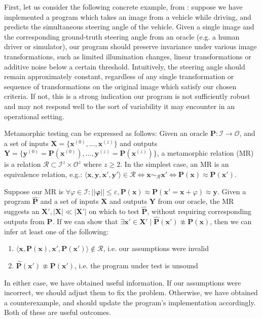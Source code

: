 \documentclass[12pt,initial,twoside,maitrise]{dms}
\numberwithin{equation}{section}
\numberwithin{table}{chapter}
\numberwithin{figure}{chapter}
\begin{document}
First, let us consider the following concrete example, from \citet{tian2018deeptest}: suppose we have implemented a program which takes an image from a vehicle while driving, and predicts the simultaneous steering angle of the vehicle. Given a single image and the corresponding ground-truth steering angle from an oracle (e.g. a human driver or simulator), our program should preserve invariance under various image transformations, such as limited illumination changes, linear transformations or additive noise below a certain threshold. Intuitively, the steering angle should remain approximately constant, regardless of any single transformation or sequence of transformations on the original image which satisfy our chosen criteria. If not, this is a strong indication our program is not sufficiently robust and may not respond well to the sort of variability it may encounter in an operational setting.

Metamorphic testing can be expressed as follows: Given an oracle $\mathbf P: \mathcal I \rightarrow \mathcal O$, and a set of inputs $\mathbf X = \{\mathbf{x}^{(0)}, \dots, \mathbf{x}^{(z)}\}$ and outputs $\mathbf Y = \{\mathbf{y}^{(0)} = \mathbf{P}(\mathbf{x}^{(0)}), \dots, \mathbf{y}^{(z)} = \mathbf{P}(\mathbf{x}^{(z)})\}$, a metamorphic relation (MR) is a relation $\mathcal R \subset \mathcal I^z \times \mathcal O^z$ where $z \geq 2$. In the simplest case, an MR is an equivalence relation, e.g.: $\langle \mathbf x, \mathbf y, \mathbf x', \mathbf y' \rangle \in \mathcal R \Leftrightarrow \mathbf x \sim_{\mathcal R} \mathbf x' \Leftrightarrow \mathbf P(\mathbf x) \approx \mathbf P(\mathbf x')$.

Suppose our MR is $\forall \varphi \in \mathcal I: ||\mathbf\varphi|| \leq \varepsilon, \mathbf P(\mathbf x) \approx \mathbf P(\mathbf x' = \mathbf x + \varphi) \approx \mathbf y$. Given a program $\mathbf{\hat P}$ and a set of inputs $\mathbf X$ and outputs $\mathbf Y$ from our oracle, the MR suggests an $\mathbf X', |\mathbf X| \ll |\mathbf X'|$ on which to test $\mathbf{\hat P}$, without requiring corresponding outputs from $\mathbf P$. If we can show that $\exists \mathbf x' \in \mathbf X' \mid \mathbf{\hat P}(\mathbf x') \not\approx \mathbf P(\mathbf x)$, then we can infer at least one of the following:

\begin{enumerate}
\item $\langle \mathbf x, \mathbf P(\mathbf x), \mathbf x', \mathbf P(\mathbf x')\rangle \notin \mathcal R$, i.e. our assumptions were invalid
\item $\mathbf{\hat P}(\mathbf x') \not\approx \mathbf{P}(\mathbf x')$, i.e. the program under test is unsound
\end{enumerate}
%
In either case, we have obtained useful information. If our assumptions were incorrect, we should adjust them to fix the problem. Otherwise, we have obtained a counterexample, and should update the program's implementation accordingly. Both of these are useful outcomes.
\end{document}
